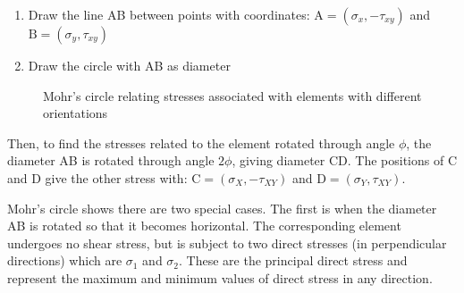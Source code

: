 \begin{enumerate}
  \item Draw the line AB between points with coordinates: \(\text{A} = (\sigma_x, -\tau_{xy}) \) and \(\text{B} = (\sigma_y, \tau_{xy}) \)
  \item Draw the circle with AB as diameter
\end{enumerate}



\begin{figure}[h!]
  \center{}
  \caption{Mohr's circle relating stresses associated with elements with different orientations}
  \label{fig-m-circle}
\end{figure}

Then, to find the stresses related to the element rotated through angle \(\phi\), the diameter AB is rotated through angle \(2\phi\), giving diameter CD. The positions of C and D give the other stress with: \(\text{C} = (\sigma_X, -\tau_{XY}) \) and \(\text{D} = (\sigma_Y, \tau_{XY}) \).

Mohr's circle shows there are two special cases. The first is when the diameter AB is rotated so that it becomes horizontal. The corresponding element undergoes no shear stress, but is subject to two direct stresses (in perpendicular directions) which are \(\sigma_1\) and \(\sigma_2\). These are the principal direct stress and represent the maximum and minimum values of direct stress in any direction.


